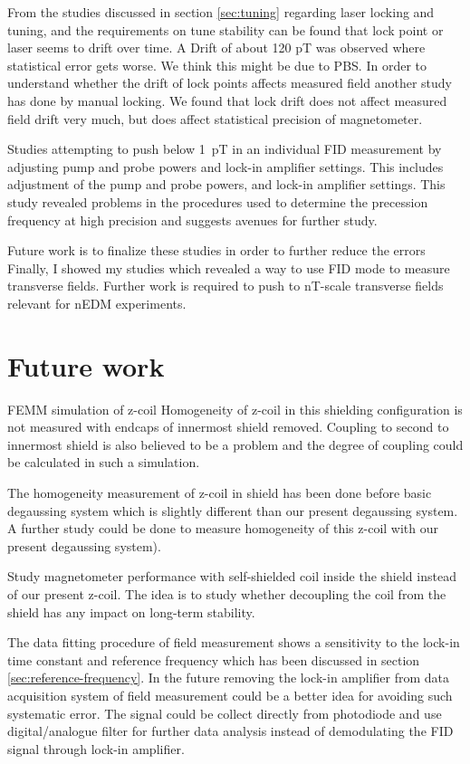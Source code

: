   From the studies discussed in section \ref{sec:tuning} regarding laser locking and tuning, and the requirements on
  tune stability can be found that
    lock point or laser seems to drift over time.  A Drift of
     about 120 pT was observed where statistical error gets worse.  We think this might be due to PBS. In order to understand 
   whether the drift of lock points affects measured
      field another study has done by manual locking. We found that lock drift does not affect measured field
      drift very much, but does affect statistical precision of
      magnetometer.

 Studies attempting to push below 1~pT in an individual FID
  measurement by adjusting pump and probe powers and lock-in amplifier
  settings.  This includes adjustment of the pump and probe powers,
  and lock-in amplifier settings.  This study revealed problems in the
  procedures used to determine the precession frequency at high
  precision and suggests avenues for further study.

  Future work is to finalize these studies in order to further reduce
  the errors
 Finally, I showed my studies which revealed a way to use FID
  mode to measure transverse fields.  Further work is required to push
  to nT-scale transverse fields relevant for nEDM experiments.

\section{Future work}

FEMM simulation of z-coil 	Homogeneity of z-coil in this shielding configuration is not  measured with endcaps of innermost shield removed.  Coupling to second to innermost shield is also believed to be a problem and the degree of coupling could be calculated in such a simulation.

The homogeneity measurement of z-coil in shield  has been done before basic degaussing system which is slightly different than our present degaussing system. A further study could be done to measure homogeneity of this z-coil with our present degaussing system).


Study magnetometer performance with self-shielded coil inside the shield instead of our present z-coil. The idea  is to study whether decoupling the coil from the shield has any impact on long-term stability.

The data fitting procedure of field measurement shows a sensitivity to the lock-in time constant and reference frequency which has been discussed in section \ref{sec:reference-frequency}.  In the future removing the lock-in amplifier from data  acquisition system of field measurement could be a better idea for avoiding such systematic error. The signal could be collect directly from photodiode and use digital/analogue filter for further data analysis  instead of demodulating the FID signal through lock-in amplifier.          

